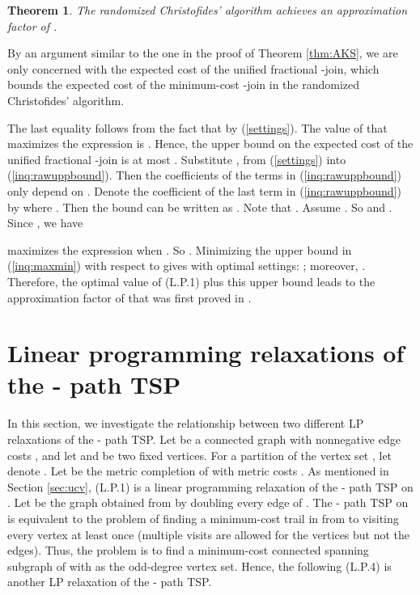 \documentclass[11pt]{article}
\newcommand{\qed}{\hspace*{\fill}}
\newtheorem{theorem}{Theorem}[section]
\newenvironment{proof}[1][Proof. ]{\noindent {\bf #1 }}{\qed}
\begin{document}
\begin{theorem}\cite{sebo13}
The randomized Christofides' algorithm achieves an
approximation factor of .
\end{theorem}
\begin{proof}
By an argument similar to the one in the proof of Theorem \ref{thm:AKS}, we are only concerned with the expected cost of the unified fractional -join, which bounds the expected cost of the minimum-cost -join  in the randomized Christofides' algorithm.

The last equality follows from the fact that  by (\ref{settings}). The value of  that maximizes the expression is . Hence, the upper bound on the expected cost of the unified fractional
-join is at most . Substitute ,  from (\ref{settings}) into (\ref{inq:rawuppbound}). Then the coefficients of the terms in (\ref{inq:rawuppbound}) only depend on . Denote the coefficient of the last term in (\ref{inq:rawuppbound}) by  where . Then the bound can be written as .
Note that . Assume . So 
and . Since , we have

 maximizes the expression when . So . Minimizing
the upper bound in (\ref{inq:maxmin}) with respect to  gives  with optimal settings:
 ; moreover, .
Therefore, the optimal value of (L.P.1) plus this upper bound  leads to
the approximation factor of
 that was first proved in \cite{sebo13}.
\end{proof}




\section{Linear programming relaxations of the - path TSP}\label{sec:LPs}

In this section, we investigate the relationship between two different LP
relaxations of the - path TSP. Let  be a connected
graph with nonnegative edge costs , and
let  and  be two fixed vertices.
For a partition  of
the vertex set ,
let  denote .
Let  be the metric completion of  with metric costs .
As mentioned in Section \ref{sec:ucv}, (L.P.1) is a linear
programming relaxation of the - path TSP on .  Let 
be the graph obtained from  by doubling every edge of . The
- path TSP on  is equivalent to
the problem of finding a minimum-cost trail in  from  to 
visiting every vertex at least once (multiple visits are allowed for the vertices but not the edges).
Thus, the problem is to find a minimum-cost connected
spanning subgraph of  with  as the odd-degree vertex set.
Hence, the following (L.P.4) is another LP relaxation of
the - path TSP.
\end{document}
